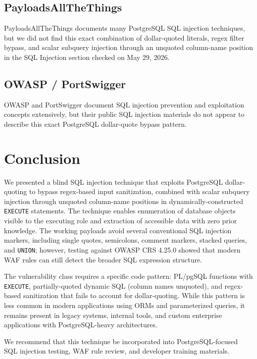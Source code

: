 \documentclass[11pt]{article}
\begin{document}
\subsection{PayloadsAllTheThings}
PayloadsAllTheThings documents many PostgreSQL SQL injection techniques, but we
did not find this exact combination of dollar-quoted literals, regex filter
bypass, and scalar subquery injection through an unquoted column-name position in
the SQL Injection section checked on May 29, 2026.

\subsection{OWASP / PortSwigger}
OWASP and PortSwigger document SQL injection prevention and exploitation concepts
extensively, but their public SQL injection materials do not appear to describe
this exact PostgreSQL dollar-quote bypass pattern.

\section{Conclusion}

We presented a blind SQL injection technique that exploits PostgreSQL
dollar-quoting to bypass regex-based input sanitization, combined with scalar
subquery injection through unquoted column-name positions in
dynamically-constructed \lstinline|EXECUTE| statements. The technique enables
enumeration of database objects visible to the executing role and extraction of
accessible data with zero prior knowledge. The working payloads avoid several
conventional SQL injection markers, including single quotes, semicolons, comment
markers, stacked queries, and \lstinline|UNION|; however, testing against OWASP
CRS 4.25.0 showed that modern WAF rules can still detect the broader SQL
expression structure.

The vulnerability class requires a specific code pattern: PL/pgSQL functions with
\lstinline|EXECUTE|, partially-quoted dynamic SQL (column names unquoted), and
regex-based sanitization that fails to account for dollar-quoting. While this
pattern is less common in modern applications using ORMs and parameterized
queries, it remains present in legacy systems, internal tools, and custom
enterprise applications with PostgreSQL-heavy architectures.

We recommend that this technique be incorporated into PostgreSQL-focused SQL
injection testing, WAF rule review, and developer training materials.
\end{document}
